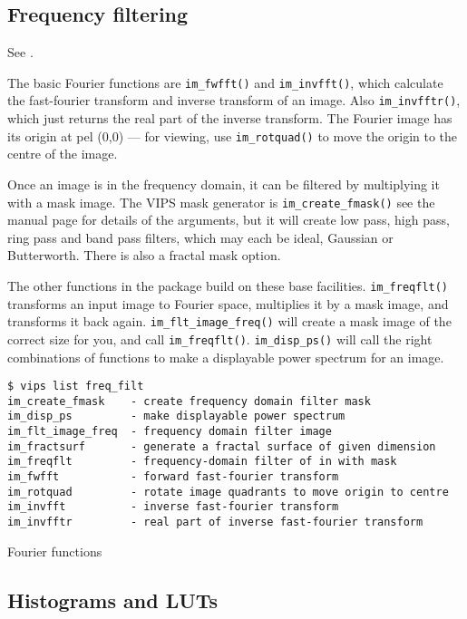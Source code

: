 \subsection{Frequency filtering}

See .

The basic Fourier functions are \verb+im_fwfft()+ and
\verb+im_invfft()+, which calculate the fast-fourier transform and inverse
transform of an image. Also \verb+im_invfftr()+, which just returns the real
part of the inverse transform.
The Fourier image has its origin at pel (0,0) ---
for viewing, use \verb+im_rotquad()+ to move the origin to the centre of
the image.

Once an image is in the frequency domain, it can be filtered by multiplying
it with a mask image. The VIPS mask generator is \verb+im_create_fmask()+
see the manual page for details of the arguments, but it will create low
pass, high pass, ring pass and band pass filters, which may each be ideal,
Gaussian or Butterworth. There is also a fractal mask option.

The other functions in the package build on these base
facilities. \verb+im_freqflt()+ transforms an input image to
Fourier space, multiplies it by a mask image, and transforms it back
again. \verb+im_flt_image_freq()+ will create a mask image of the correct
size for you, and call \verb+im_freqflt()+.  \verb+im_disp_ps()+ will call
the right combinations of functions to make a displayable power spectrum
for an image.

\begin{fig2}
\begin{verbatim}
$ vips list freq_filt    
im_create_fmask    - create frequency domain filter mask
im_disp_ps         - make displayable power spectrum
im_flt_image_freq  - frequency domain filter image
im_fractsurf       - generate a fractal surface of given dimension
im_freqflt         - frequency-domain filter of in with mask
im_fwfft           - forward fast-fourier transform
im_rotquad         - rotate image quadrants to move origin to centre
im_invfft          - inverse fast-fourier transform
im_invfftr         - real part of inverse fast-fourier transform
\end{verbatim}
\caption{Fourier functions}
\label{fg:freq}
\end{fig2}

\subsection{Histograms and LUTs}

